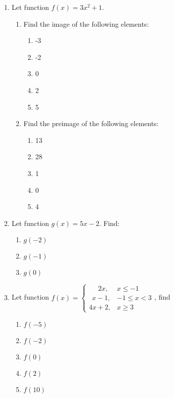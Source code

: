 \documentclass{report}
\begin{document}
\begin{multicols}{2}
\begin{enumerate}
    \item Let function $f(x) = 3x^2 + 1$.
          \begin{enumerate}
            \item Find the image of the following elements:
                  \begin{enumerate}
                    \item -3
                    \item -2
                    \item 0
                    \item 2
                    \item 5
                  \end{enumerate}
            \item Find the preimage of the following elements:
                  \begin{enumerate}
                    \item 13
                    \item 28
                    \item 1
                    \item 0
                    \item 4
                  \end{enumerate}
          \end{enumerate}

    \item Let function $g(x) = 5x-2$. Find:
          \begin{enumerate}
            \item $g(-2)$
            \item $g(-1)$
            \item $g(0)$
          \end{enumerate}

    \item Let function $f(x) = \left\{\begin{array}{ll}
              \ \ \ \ \ \ 2x, & x \leq -1     \\
              \ \ x-1,        & -1 \leq x < 3 \\
              4x + 2,         & x \geq 3
            \end{array}\right.$, find

          \begin{enumerate}
            \item $f(-5)$
            \item $f(-2)$
            \item $f(0)$
            \item $f(2)$
            \item $f(10)$
          \end{enumerate}


\end{enumerate}
\end{multicols}
\end{document}
